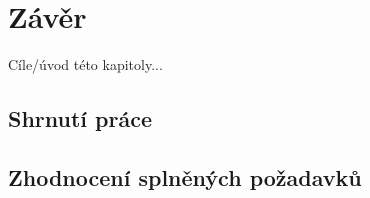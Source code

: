 \chapter*{Závěr}

Cíle/úvod této kapitoly...

\section{Shrnutí práce}

\section{Zhodnocení splněných požadavků}